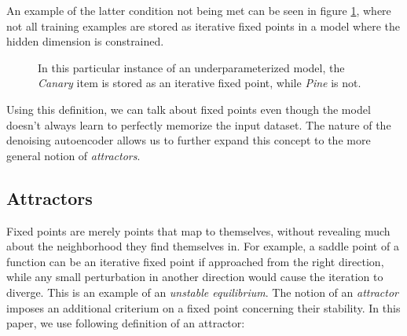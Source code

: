 \documentclass[11pt]{article}
\theoremstyle{remark}
\begin{document}
\noindent An example of the latter condition not being met can be seen in figure \ref{fig:fixed}, where not all training examples are stored as iterative fixed points in a model where the hidden dimension is constrained.

\begin{figure}%
  \centering
  \qquad
  \caption{In this particular instance of an underparameterized model, the \textit{Canary} item is stored as an iterative fixed point, while \textit{Pine} is not.}%
  \label{fig:fixed}%
\end{figure}

Using this definition, we can talk about fixed points even though the model doesn't always learn to perfectly memorize the input dataset. The nature of the denoising autoencoder allows us to further expand this concept to the more general notion of \textit{attractors}.

\subsection{Attractors}

Fixed points are merely points that map to themselves, without revealing much about the neighborhood they find themselves in. For example, a saddle point of a function can be an iterative fixed point if approached from the right direction, while any small perturbation in another direction would cause the iteration to diverge. This is an example of an \textit{unstable equilibrium}. The notion of an \textit{attractor} imposes an additional criterium on a fixed point concerning their stability. In this paper, we use following definition of an attractor:
\end{document}
